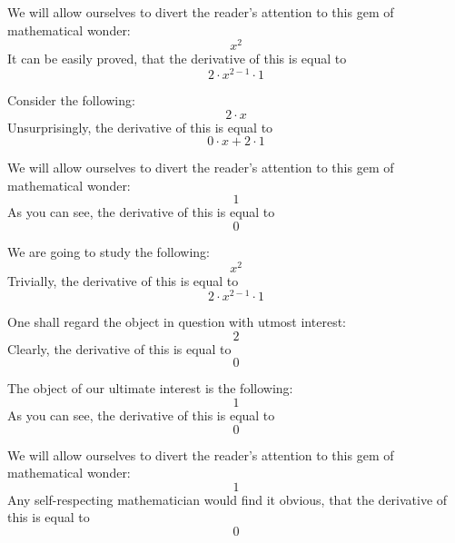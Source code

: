 \documentclass{article}
\begin{document}
We will allow ourselves to divert the reader's attention to this gem of mathematical wonder:
\begin{equation}
x ^{2 } 
\end{equation}
It can be easily proved, that the derivative of this is equal to
\begin{equation}
2 \cdot x ^{2 - 1 } \cdot 1 
\end{equation}

Consider the following:
\begin{equation}
2 \cdot x 
\end{equation}
Unsurprisingly, the derivative of this is equal to
\begin{equation}
0 \cdot x + 2 \cdot 1 
\end{equation}

We will allow ourselves to divert the reader's attention to this gem of mathematical wonder:
\begin{equation}
1 
\end{equation}
As you can see, the derivative of this is equal to
\begin{equation}
0 
\end{equation}

We are going to study the following:
\begin{equation}
x ^{2 } 
\end{equation}
Trivially, the derivative of this is equal to
\begin{equation}
2 \cdot x ^{2 - 1 } \cdot 1 
\end{equation}

One shall regard the object in question with utmost interest:
\begin{equation}
2 
\end{equation}
Clearly, the derivative of this is equal to
\begin{equation}
0 
\end{equation}

The object of our ultimate interest is the following:
\begin{equation}
1 
\end{equation}
As you can see, the derivative of this is equal to
\begin{equation}
0 
\end{equation}

We will allow ourselves to divert the reader's attention to this gem of mathematical wonder:
\begin{equation}
1 
\end{equation}
Any self-respecting mathematician would find it obvious, that the derivative of this is equal to
\begin{equation}
0 
\end{equation}
\end{document}
